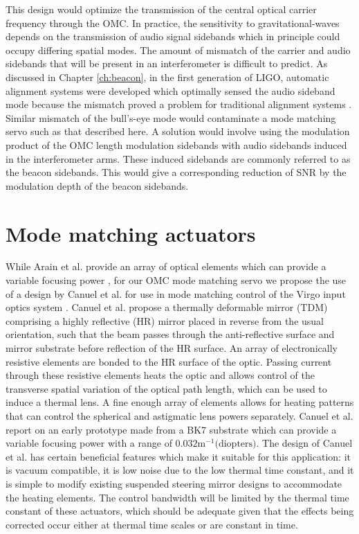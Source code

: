 This design would optimize the transmission of the central optical carrier frequency through the OMC. %
In practice, the sensitivity to gravitational-waves depends on the transmission of audio signal sidebands which in principle could occupy differing spatial modes. %
The amount of mismatch of the carrier and audio sidebands that will be present in an interferometer is difficult to predict. %
As discussed in Chapter \ref{ch:beacon}, in the first generation of LIGO, automatic alignment systems were developed which optimally sensed the audio sideband mode because the mismatch proved a problem for traditional alignment systems \cite{Smith-Lefebvre:11,Tobin}. %
Similar mismatch of the bull's-eye mode would contaminate a mode matching servo such as that described here. %
A solution would involve using the modulation product of the OMC length modulation sidebands with audio sidebands induced in the interferometer arms. %
These induced sidebands are commonly referred to as the beacon sidebands. %
This would give a corresponding reduction of SNR by the modulation depth of the beacon sidebands.

\section{Mode matching actuators}
While Arain et al. %
provide an array of optical elements which can provide a variable focusing power \cite{Arain:10}, for our OMC mode matching servo we propose the use of a design by Canuel et al. %
for use in mode matching control of the Virgo input optics system \cite{Canuel}. %
Canuel et al. %
propose a thermally deformable mirror (TDM) comprising a highly reflective (HR) mirror placed in reverse from the usual orientation, such that the beam passes through the anti-reflective surface and mirror substrate before reflection of the HR surface. %
An array of electronically resistive elements are bonded to the HR surface of the optic. %
Passing current through these resistive elements heats the optic and allows control of the transverse spatial variation of the optical path length, which can be used to induce a thermal lens. %
A fine enough array of elements allows for heating patterns that can control the spherical and astigmatic lens powers separately. %
Canuel et al. %
report on an early prototype made from a BK7 substrate which can provide a variable focusing power with a range of $0.032 \text{m}^{-1} \text{(diopters)}$. %
The design of Canuel et al. %
has certain beneficial features which make it suitable for this application: it is vacuum compatible, it is low noise due to the low thermal time constant, and it is simple to modify existing suspended steering mirror designs to accommodate the heating elements. %
The control bandwidth will be limited by the thermal time constant of these actuators, which should be adequate given that the effects being corrected occur either at thermal time scales or are constant in time.

